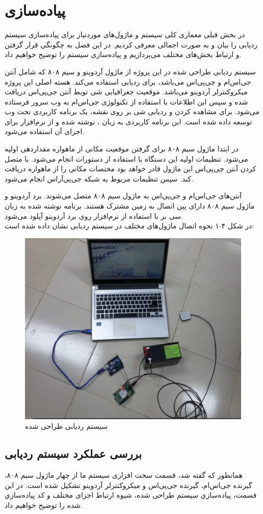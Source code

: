 \chapter{پیاده‌سازی}
در بخش قبلی معماری کلی سیستم و ماژول‌های موردنیاز برای پیاده‌سازی سیستم ردیابی را بیان و به صورت اجمالی معرفی کردیم. در این فصل به چگونگی قرار گرفتن و ارتباط بخش‌های مختلف می‌پردازیم و پیاده‌سازی سیستم را توضیح خواهیم داد.


سیستم ردیابی طراحی شده در این پروژه از ماژول آردوینو و سیم ۸۰۸ که شامل آنتن جی‌اس‌ام و جی‌پی‌اس می‌باشد، برای ردیابی استفاده می‌کند. هسته اصلی این پروژه میکروکنترلر آردوینو می‌باشد. موقعیت جغرافیایی شی تویط آنتن جی‌پی‌اس دریافت شده و سپس این اطلاعات با استفاده از تکنولوژی جی‌اس‌ام به وب سرور فرستاده می‌شود. برای مشاهده کردن و ردیابی شی بر روی نقشه، یک برنامه کاربردی تحت وب توسعه داده شده است. این برنامه کاربردی به زبان ،  نوشته شده و از نرم‌افزار  برای اجرای آن استفاده می‌شود.
 
 
در ابتدا ماژول سیم ۸۰۸ برای گرفتن موقعیت مکانی از ماهواره مقداردهی اولیه می‌شود. تنظیمات اولیه این دستگاه با استفاده از دستورات  انجام می‌شود. با متصل کردن آنتن چی‌پی‌اس این ماژول قادر خواهد بود مختصات مکانی را از ماهواره دریافت کند. سپس تنظیمات مربوط به شبکه جی‌پی‌آر‌اس انجام می‌شود.


آنتن‌های جی‌اس‌ام و جی‌پی‌اس به ماژول سیم ۸۰۸ متصل می‌شوند. برد آردوینو و ماژول سیم ۸۰۸ دارای پین اتصال به زمین مشترک هستند. برنامه نوشته شده به زبان سی بر با استفاده از نرم‌افزار  روی برد آردوینو آپلود می‌شود.
\\
در شکل ۴-۱ نحوه اتصال ماژول‌های مختلف در سیستم ردیابی نشان داده شده است:
\begin{figure}[!h]
	\centerline{\includegraphics[width=.6\textwidth]{design-system}}
	\caption{سیستم ردیابی طراحی شده}
\end{figure}
\section{بررسی عملکرد سیستم ردیابی}
همانطور كه گفته شد، قسمت سخت‌ افزاری سیستم ما از چهار ماژول سیم ۸۰۸، گیرنده جی‌اس‌ام، گیرنده جی‌پی‌اس و میکروکنترلر آردوینو تشکیل شده است. در اين قسمت، پياده‌سازي سيستم طراحی شده، شيوه ارتباط اجزای مختلف و كد پياده‌سازي شده را توضيح خواهیم داد.
